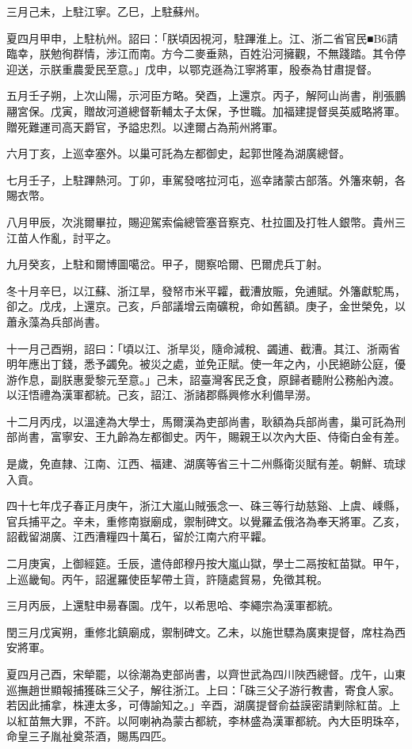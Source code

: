 \begin{pinyinscope}
三月己未，上駐江寧。乙巳，上駐蘇州。

夏四月甲申，上駐杭州。詔曰：「朕頃因視河，駐蹕淮上。江、浙二省官民■B6請臨幸，朕勉徇群情，涉江而南。方今二麥垂熟，百姓沿河擁觀，不無踐踏。其令停迎送，示朕重農愛民至意。」戊申，以鄂克遜為江寧將軍，殷泰為甘肅提督。

五月壬子朔，上次山陽，示河臣方略。癸酉，上還京。丙子，解阿山尚書，削張鵬翮宮保。戊寅，贈故河道總督靳輔太子太保，予世職。加福建提督吳英威略將軍。贈死難運司高天爵官，予謚忠烈。以達爾占為荊州將軍。

六月丁亥，上巡幸塞外。以巢可託為左都御史，起郭世隆為湖廣總督。

七月壬子，上駐蹕熱河。丁卯，車駕發喀拉河屯，巡幸諸蒙古部落。外籓來朝，各賜衣幣。

八月甲辰，次洮爾畢拉，賜迎駕索倫總管塞音察克、杜拉圖及打牲人銀幣。貴州三江苗人作亂，討平之。

九月癸亥，上駐和爾博圖噶岔。甲子，閱察哈爾、巴爾虎兵丁射。

冬十月辛巳，以江蘇、浙江旱，發帑市米平糶，截漕放賑，免逋賦。外籓獻駝馬，卻之。戊戌，上還京。己亥，戶部議增云南礦稅，命如舊額。庚子，金世榮免，以蕭永藻為兵部尚書。

十一月己酉朔，詔曰：「頃以江、浙旱災，隨命減稅、蠲逋、截漕。其江、浙兩省明年應出丁錢，悉予蠲免。被災之處，並免正賦。使一年之內，小民絕跡公庭，優游作息，副朕惠愛黎元至意。」己未，詔臺灣客民乏食，原歸者聽附公務船內渡。以汪悟禮為漢軍都統。己亥，詔江、浙諸郡縣興修水利備旱澇。

十二月丙戌，以溫達為大學士，馬爾漢為吏部尚書，耿額為兵部尚書，巢可託為刑部尚書，富寧安、王九齡為左都御史。丙午，賜親王以次內大臣、侍衛白金有差。

是歲，免直隸、江南、江西、福建、湖廣等省三十二州縣衛災賦有差。朝鮮、琉球入貢。

四十七年戊子春正月庚午，浙江大嵐山賊張念一、硃三等行劫慈谿、上虞、嵊縣，官兵捕平之。辛未，重修南嶽廟成，禦制碑文。以覺羅孟俄洛為奉天將軍。乙亥，詔截留湖廣、江西漕糧四十萬石，留於江南六府平糶。

二月庚寅，上御經筵。壬辰，遣侍郎穆丹按大嵐山獄，學士二鬲按紅苗獄。甲午，上巡畿甸。丙午，詔暹羅使臣挈帶土貨，許隨處貿易，免徵其稅。

三月丙辰，上還駐申昜春園。戊午，以希思哈、李繩宗為漢軍都統。

閏三月戊寅朔，重修北鎮廟成，禦制碑文。乙未，以施世驃為廣東提督，席柱為西安將軍。

夏四月己酉，宋犖罷，以徐潮為吏部尚書，以齊世武為四川陜西總督。戊午，山東巡撫趙世顯報捕獲硃三父子，解往浙江。上曰：「硃三父子游行教書，寄食人家。若因此捕拿，株連太多，可傳諭知之。」辛酉，湖廣提督俞益謨密請剿除紅苗。上以紅苗無大罪，不許。以阿喇衲為蒙古都統，李林盛為漢軍都統。內大臣明珠卒，命皇三子胤祉奠茶酒，賜馬四匹。


\end{pinyinscope}

